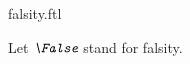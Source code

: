\documentclass{stex}
\begin{document}
\begin{smodule}{falsity.ftl}


\begin{fakeforthel}
  \begin{convention}[for=False]
    Let $\emph{\False}$ stand for falsity.
  \end{convention}
\end{fakeforthel}

\end{smodule}
\end{document}
